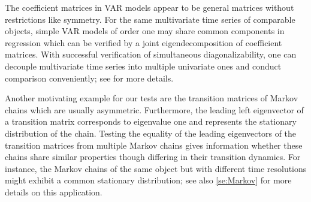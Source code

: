 \documentclass[12pt]{article}
\numberwithin{thm}{section}
\numberwithin{defn}{section}
\numberwithin{lem}{section}
\numberwithin{prop}{section}
\numberwithin{cor}{section}
\numberwithin{rem}{section}
\begin{document}
The coefficient matrices in VAR models appear to be general matrices without restrictions like symmetry. 
For the same multivariate time series of comparable objects, simple VAR models of order one may share common components in regression which can be verified by a joint eigendecomposition of coefficient matrices. With successful verification of simultaneous diagonalizability, one can decouple multivariate time series into multiple univariate ones and conduct comparison conveniently; see  for more details.

Another motivating example for our tests are the transition matrices of Markov chains which are usually asymmetric. Furthermore, the leading left eigenvector of a transition matrix corresponds to eigenvalue one and represents the stationary distribution of the chain. Testing the equality of the leading eigenvectors of the transition matrices from multiple Markov chains gives information whether these chains share similar properties though differing in their transition dynamics. For instance, the Markov chains of the same object but with different time resolutions might exhibit a common stationary distribution; see also \autoref{se:Markov} for more details on this application.



\vspace{-0.5cm}
\end{document}
